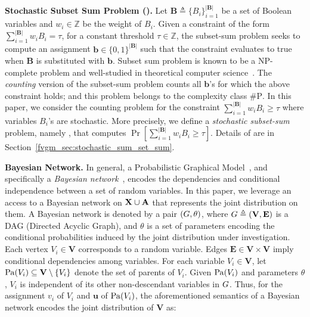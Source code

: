 	\textbf{Stochastic Subset Sum Problem ({\stochastic}).} 
	Let $ \mathbf{B} \triangleq \{B_i\}_{i=1}^{|\mathbf{B}|}$ be a set of Boolean variables and $ w_i \in \mathbb{Z} $ be the weight of $ B_i $. Given a constraint of the form  $\sum_{i = 1}^ {|\mathbf{B}|} w_i B_i = \tau $, for a constant threshold $ \tau \in \mathbb{Z} $, the subset-sum problem seeks to compute an assignment $\mathbf{b} \in \{0,1\}^{|\mathbf{B}|}$ such that the constraint evaluates to true when $\mathbf{B}$ is substituted with $\mathbf{b}$. Subset sum problem is known to be a $ \mathrm{NP} $-complete problem and well-studied in theoretical computer science~\cite{kleinberg2006algorithm}. The \textit{counting} version of the subset-sum problem counts all $ \mathbf{b} $'s for which the above constraint holds; and this problem belongs to the complexity class $ \mathrm{\#P} $. In this paper, we consider the counting problem for the constraint $\sum_{i = 1}^ {|\mathbf{B}|} w_i B_i \ge \tau $ where variables $ B_i $'s are stochastic. More precisely, we define a \textit{stochastic subset-sum} problem, namely {\stochastic}, that computes $ \Pr[\sum_{i = 1}^ {|\mathbf{B}|} w_iB_i \ge \tau] $.    Details of {\stochastic} are in Section~\ref{fvgm_sec:stochastic_sum_set_sum}.
	
	
		
	\textbf{Bayesian Network.}
	In general, a Probabilistic Graphical Model~\cite{koller2009probabilistic}, and specifically a \textit{Bayesian network}~\cite{pearl1985bayesian,chavira2008probabilistic}, encodes the dependencies and conditional independence between a set of random variables. In this paper, we leverage an access to a Bayesian network on $ \mathbf{X} \cup \mathbf{A} $ that represents the joint distribution on them. 	A Bayesian network is denoted by a pair $ (G, \theta)$, where $ G \triangleq (\mathbf{V}, \mathbf{E}) $ is a DAG (Directed Acyclic Graph), and $\theta$ is a set of parameters encoding the conditional probabilities induced by the joint distribution under investigation. Each vertex $V_i \in \mathbf{V}$ corresponds to a random variable. Edges $ \mathbf{E} \in \mathbf{V} \times \mathbf{V} $ imply conditional dependencies among variables. For each variable $ V_i \in \mathbf{V} $, let $ \mathrm{Pa}(V_i) \subseteq \mathbf{V} \setminus \{V_i\} $ denote the set of parents of $ V_i $. Given $\mathrm{Pa}(V_i)$ and parameters $\theta$, $ V_i $ is independent of its other non-descendant variables in $G$. Thus, for the assignment $ v_i $ of $ V_i $ and $ \mathbf{u} $ of $ \mathrm{Pa}(V_i) $, the aforementioned semantics of a Bayesian network encodes the joint distribution of $\mathbf{V}$ as:
	
